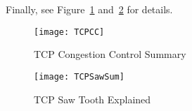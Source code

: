 Finally, see Figure~\ref{fig:tcp:TCPCC} and~\ref{fig:tcp:TCPSawSum} for details.
	
\begin{figure}[t]
  \centering
  \texttt{[image: TCPCC]}
  \caption{TCP Congestion Control Summary}
  \label{fig:tcp:TCPCC}
\end{figure}

\begin{figure}[t]
  \centering
  \texttt{[image: TCPSawSum]}
  \caption{TCP Saw Tooth Explained}
  \label{fig:tcp:TCPSawSum}
\end{figure}
